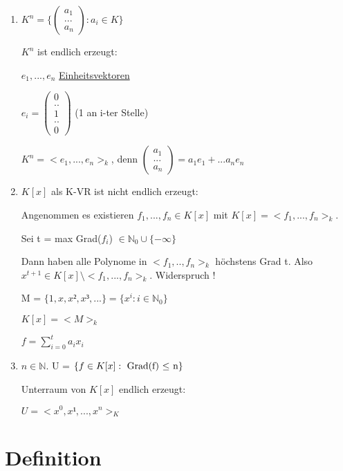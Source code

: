 \documentclass[a4paper, openany]{book}
\begin{document}
    \begin{enumerate}[label=(\alph*)]
      \item $K^n =  \{ \begin{pmatrix}a_1 \\ ... \\ a_n \end{pmatrix}: a_i \in K \}$

      $K^n$ ist endlich erzeugt:

      $e_1, ..., e_n$ \underline{Einheitsvektoren}

      $e_i = \begin{pmatrix}0 \\ .. \\ 1 \\.. \\ 0 \end{pmatrix}$ (1 an i-ter Stelle)

      $K^n = <e_1,...,e_n>_k$, denn $\begin{pmatrix}a_1 \\ ... \\ a_n \end{pmatrix} = a_1e_1+...a_ne_n$

      \item $K[x]$ als K-VR ist nicht endlich erzeugt:

      Angenommen es existieren $f_1,...,f_n \in K[x]$ mit $K[x] = <f_1,...,f_n>_k$.

      Sei t = max Grad($f_i$) $\in \mathbb{N}_0 \cup \{- \infty\}$

      Dann haben alle Polynome in $<f_1, .., f_n>_k$ höchstens Grad t. Also $x^{t+1} \in K[x] \setminus <f_1,...,f_n>_k$. Widerspruch !

      M = $\{1,x,x²,x³,...\} = \{ x^i : i \in \mathbb{N}_0 \}$

      $K[x] = <M>_k$

      $f = \sum_{i=0}^{t} a_ix_i$

      \item $n \in \mathbb{N}$. U = $\{ f \in K[x]: \textnormal{ Grad(f) $\le$ n}\}$

      Unterraum von $K[x]$ endlich erzeugt:

      $U = <x^0, x¹, ..., x^n>_K$
    \end{enumerate}

    \section{Definition}
\end{document}
